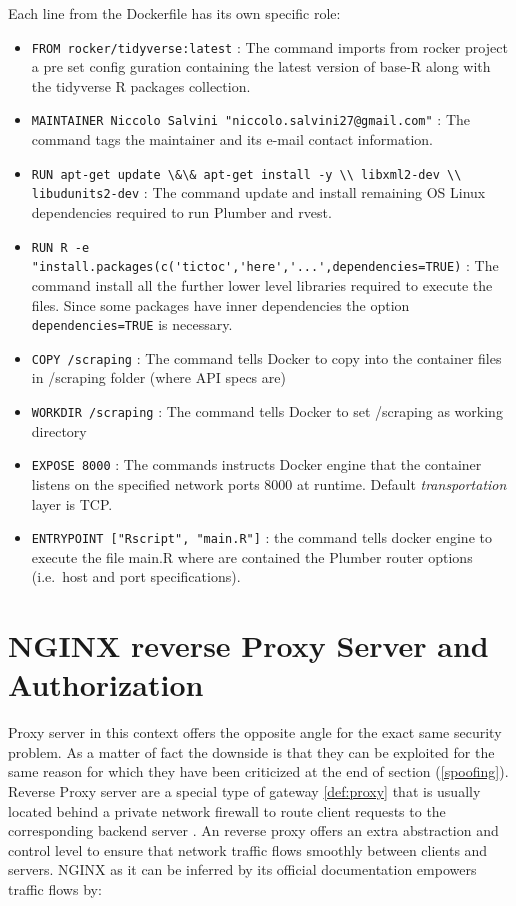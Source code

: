 \documentclass[
  12pt,
  a4paper,
  oneside]{book}
\newcommand{\passthrough}[1]{#1}
\theoremstyle{definition}
\theoremstyle{definition}
\theoremstyle{definition}
\theoremstyle{remark}
\begin{document}
Each line from the Dockerfile has its own specific role:

\begin{itemize}
\item
  \passthrough{\lstinline!FROM rocker/tidyverse:latest!} : The command imports from rocker project a pre set config guration containing the latest version of base-R along with the tidyverse \citep{tidyverse} R packages collection.
\item
  \passthrough{\lstinline!MAINTAINER Niccolo Salvini "niccolo.salvini27@gmail.com"!} : The command tags the maintainer and its e-mail contact information.
\item
  \passthrough{\lstinline!RUN apt-get update \&\& apt-get install -y \\ libxml2-dev \\ libudunits2-dev!} : The command update and install remaining OS Linux dependencies required to run Plumber and rvest.
\item
  \passthrough{\lstinline!RUN R -e "install.packages(c('tictoc','here','...',dependencies=TRUE)!} : The command install all the further lower level libraries required to execute the files. Since some packages have inner dependencies the option \passthrough{\lstinline!dependencies=TRUE!} is necessary.
\item
  \passthrough{\lstinline!COPY /scraping!} : The command tells Docker to copy into the container files in /scraping folder (where API specs are)
\item
  \passthrough{\lstinline!WORKDIR /scraping!} : The command tells Docker to set /scraping as working directory
\item
  \passthrough{\lstinline!EXPOSE 8000!} : The commands instructs Docker engine that the container listens on the specified network ports 8000 at runtime. Default \emph{transportation} layer is TCP.
\item
  \passthrough{\lstinline!ENTRYPOINT ["Rscript", "main.R"]!} : the command tells docker engine to execute the file main.R where are contained the Plumber router options (i.e.~host and port specifications).
\end{itemize}

\hypertarget{nginx}{%
\section{NGINX reverse Proxy Server and Authorization}\label{nginx}}

Proxy server in this context offers the opposite angle for the exact same security problem. As a matter of fact the downside is that they can be exploited for the same reason for which they have been criticized at the end of section (\ref{spoofing}). Reverse Proxy server are a special type of gateway \ref{def:proxy} that is usually located behind a private network firewall to route client requests to the corresponding backend server \citep{nginxDocs}. An reverse proxy offers an extra abstraction and control level to ensure that network traffic flows smoothly between clients and servers. NGINX as it can be inferred by its official documentation empowers traffic flows by:
\end{document}
